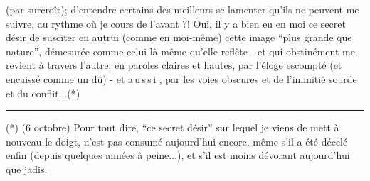 
(par surcroît); d'entendre certains des meilleurs se lamenter qu'ils ne peuvent me suivre, au rythme où je cours de l'avant ?! Oui, il y a bien eu en moi ce secret désir de susciter en autrui (comme en moi-même) cette image ``plus grande que nature'', démesurée comme celui-là même qu'elle reflète - et qui obstinément me revient à travers l'autre: en paroles claires et hautes, par l'éloge escompté (et encaissé comme un dû) - et a\,u\,s\,s\,i , par les voies obscures et  de l'inimitié sourde et du conflit...(*)

\noindent\rule{5em}{0.3pt}\par
(*) (6 octobre) Pour tout dire, ``ce secret désir'' sur lequel je viens de mett à nouveau le doigt, n'est pas consumé aujourd'hui encore, même s'il a été décelé enfin (depuis quelques années à peine...), et s'il est moins dévorant aujourd'hui que jadis.
